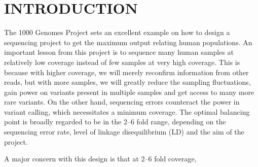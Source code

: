 \documentclass{bioinfo}
\begin{document}
\section{INTRODUCTION}

The 1000 Genomes Project sets an excellent example on how to design a sequencing project to
get the maximum output relating human populations. An important lesson from this project
is to sequence many human samples at relatively low coverage instead of
few samples at very high coverage. This is because with higher coverage,
we will merely reconfirm information from other reads, but with more samples, we
will greatly reduce the sampling fluctuations, gain power on variants present in
multiple samples and get access to many more rare variants. On the other hand, sequencing
errors counteract the power in variant calling, which necessitates a minimum coverage.
The optimal balancing point is broadly regarded to be in the 2--6 fold range,
depending on the sequencing error rate, level of linkage disequilibrium (LD) and the
aim of the project.

A major concern with this design is that at 2--6 fold coverage, 
\end{document}
